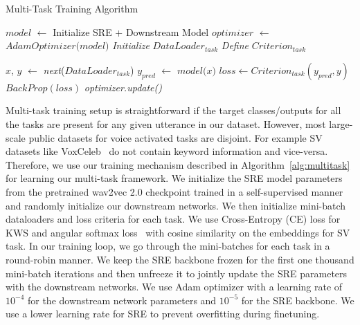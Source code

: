 \documentclass{article}
\begin{document}
\begin{algorithm}
   \caption{Multi-Task Training Algorithm}
   \label{alg:multitask}

\begin{algorithmic}
    \STATE $\textit{model}$ $\gets$ Initialize SRE + Downstream Model 
        \STATE $\textit{optimizer}$ $\gets$ $\textit{AdamOptimizer(model)}$
        \STATE \textit{Initialize} $\mathit{DataLoader}_{\mathit{task}}$
        \STATE \textit{Define} $\mathit{Criterion}_{\mathit{task}}$
    \ENDFOR
    
    
            \STATE $x$, $y$ $\gets$ \textit{next}($\mathit{DataLoader}_{\mathit{task}}$)
            \STATE $y_\textit{pred}$ $\gets$ $\textit{model(x)}$
            \STATE $\textit{loss} \gets \textit{Criterion}_{\textit{task}}(y_\textit{pred}, y)$
            \STATE $\textit{BackProp}(\textit{loss})$
            \STATE \textit{\textit{\textit{optimizer}.\textit{update}()}}
        \ENDFOR
    \ENDFOR
   
\end{algorithmic}
\end{algorithm}

Multi-task training setup is straightforward if the target classes/outputs for all the tasks are present for any given utterance in our dataset.
However, most large-scale public datasets for voice activated tasks are disjoint. For example SV datasets like VoxCeleb~\cite{nagrani2017voxceleb} do not contain keyword information and vice-versa. Therefore, we use our training mechanism described in Algorithm~\ref{alg:multitask} for learning our multi-task framework. We initialize the SRE model parameters from the pretrained wav2vec 2.0 checkpoint trained in a self-supervised manner and randomly initialize our downstream networks.
We then initialize mini-batch dataloaders and loss criteria for each task. We use Cross-Entropy (CE) loss for KWS and angular softmax loss~\cite{Liu_2017_CVPR} with cosine similarity on the embeddings for SV task. 
In our training loop, we go through the mini-batches for each task in a round-robin manner. We keep the SRE backbone frozen for the first one thousand mini-batch iterations and then unfreeze it to jointly update the SRE parameters with the downstream networks. We use Adam optimizer with a learning rate of $10^{-4}$ for the downstream network parameters and $10^{-5}$ for the SRE backbone. We use a lower learning rate for SRE to prevent overfitting during finetuning. 
\end{document}
